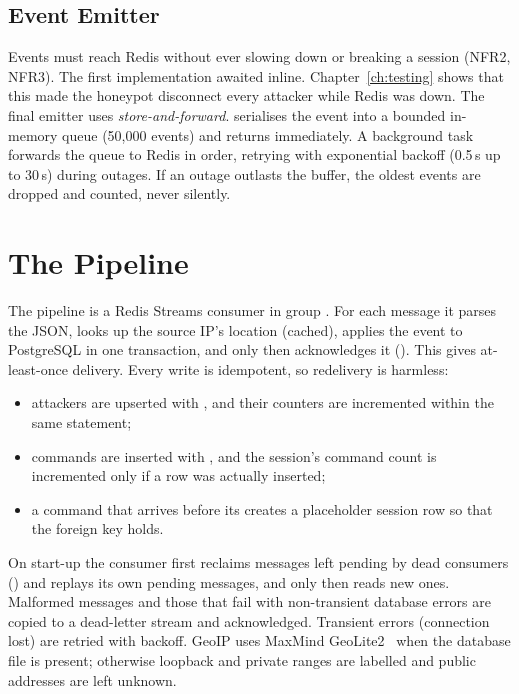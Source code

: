 \subsection{Event Emitter}

Events must reach Redis without ever slowing down or breaking a session (NFR2, NFR3). The
first implementation awaited  inline. Chapter~\ref{ch:testing} shows that this made
the honeypot disconnect every attacker while Redis was down. The final emitter uses
\emph{store-and-forward}.  serialises the event into a bounded in-memory queue
(50{,}000 events) and returns immediately. A background task forwards the queue to Redis in
order, retrying with exponential backoff (0.5\,s up to 30\,s) during outages. If an outage
outlasts the buffer, the oldest events are dropped and counted, never silently.

\section{The Pipeline}

The pipeline is a Redis Streams consumer in group . For each message it parses
the JSON, looks up the source IP's location (cached), applies the event to PostgreSQL in one
transaction, and only then acknowledges it (). This gives at-least-once delivery.
Every write is idempotent, so redelivery is harmless:
\begin{itemize}
  \item attackers are upserted with ,
    and their counters are incremented within the same statement;
  \item commands are inserted with , and the
    session's command count is incremented only if a row was actually inserted;
  \item a command that arrives before its  creates a placeholder session row
    so that the foreign key holds.
\end{itemize}
On start-up the consumer first reclaims messages left pending by dead consumers
() and replays its own pending messages, and only then reads new ones. Malformed
messages and those that fail with non-transient database errors are copied to a dead-letter
stream and acknowledged. Transient errors (connection lost) are retried with backoff. GeoIP
uses MaxMind GeoLite2~\cite{maxmind} when the database file is present; otherwise loopback
and private ranges are labelled and public addresses are left unknown.

